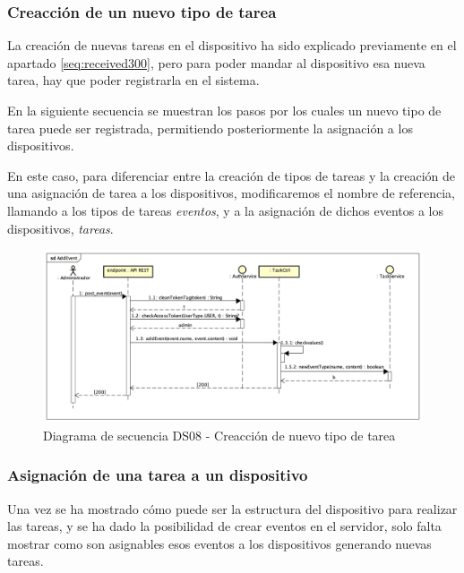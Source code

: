 \subsubsection{Creacción de un nuevo tipo de tarea}

La creación de nuevas tareas en el dispositivo ha sido explicado previamente en el apartado \ref{seq:received300}, pero para poder mandar al dispositivo esa nueva tarea, hay que poder registrarla en el sistema.

En la siguiente secuencia se muestran los pasos por los cuales un nuevo tipo de tarea puede ser registrada, permitiendo posteriormente la asignación a los dispositivos.

En este caso, para diferenciar entre la creación de tipos de tareas y la creación de una asignación de tarea a los dispositivos, modificaremos el nombre de referencia, llamando a los tipos de tareas  \textit{eventos}, y a la asignación de dichos eventos a los dispositivos, \textit{tareas}.

\begin{figure}[H]
    \centering
    \includegraphics[width=14cm]{./img/sequence/diagram/AddEvent.png}
    \caption{Diagrama de secuencia DS08 - Creacción de nuevo tipo de tarea}
    \label{fig:seq.NewEvent}
\end{figure}

\newpage
\subsubsection{Asignación de una tarea a un dispositivo}

Una vez se ha mostrado cómo puede ser la estructura del dispositivo para realizar las tareas, y se ha dado la posibilidad de crear eventos en el servidor, solo falta mostrar como son asignables esos eventos a los dispositivos generando nuevas tareas.

